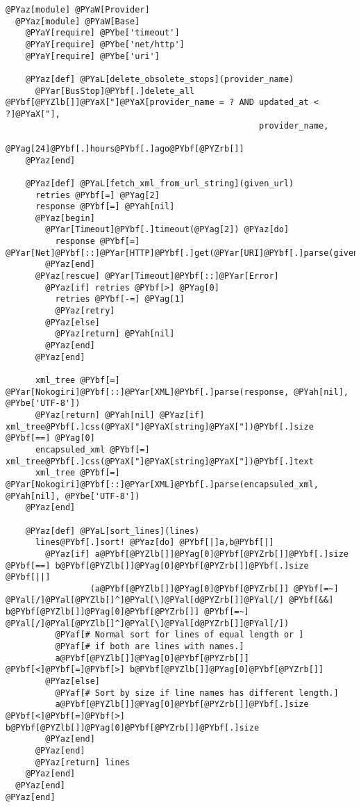 \begin{Verbatim}[commandchars=@\[\]]
@PYaz[module] @PYaW[Provider]
  @PYaz[module] @PYaW[Base]
    @PYaY[require] @PYbe['timeout']
    @PYaY[require] @PYbe['net/http']
    @PYaY[require] @PYbe['uri']
    
    @PYaz[def] @PYaL[delete_obsolete_stops](provider_name)
      @PYar[BusStop]@PYbf[.]delete_all @PYbf[@PYZlb[]]@PYaX["]@PYaX[provider_name = ? AND updated_at < ?]@PYaX["],
                                                   provider_name,
                                                    @PYag[24]@PYbf[.]hours@PYbf[.]ago@PYbf[@PYZrb[]]
    @PYaz[end]

    @PYaz[def] @PYaL[fetch_xml_from_url_string](given_url)
      retries @PYbf[=] @PYag[2]
      response @PYbf[=] @PYah[nil]
      @PYaz[begin]
        @PYar[Timeout]@PYbf[.]timeout(@PYag[2]) @PYaz[do] 
          response @PYbf[=] @PYar[Net]@PYbf[::]@PYar[HTTP]@PYbf[.]get(@PYar[URI]@PYbf[.]parse(given_url))
        @PYaz[end]
      @PYaz[rescue] @PYar[Timeout]@PYbf[::]@PYar[Error] 
        @PYaz[if] retries @PYbf[>] @PYag[0] 
          retries @PYbf[-=] @PYag[1] 
          @PYaz[retry] 
        @PYaz[else] 
          @PYaz[return] @PYah[nil]
        @PYaz[end] 
      @PYaz[end]

      xml_tree @PYbf[=] @PYar[Nokogiri]@PYbf[::]@PYar[XML]@PYbf[.]parse(response, @PYah[nil], @PYbe['UTF-8'])
      @PYaz[return] @PYah[nil] @PYaz[if] xml_tree@PYbf[.]css(@PYaX["]@PYaX[string]@PYaX["])@PYbf[.]size @PYbf[==] @PYag[0]
      encapsuled_xml @PYbf[=] xml_tree@PYbf[.]css(@PYaX["]@PYaX[string]@PYaX["])@PYbf[.]text
      xml_tree @PYbf[=] @PYar[Nokogiri]@PYbf[::]@PYar[XML]@PYbf[.]parse(encapsuled_xml, @PYah[nil], @PYbe['UTF-8'])
    @PYaz[end]

    @PYaz[def] @PYaL[sort_lines](lines)
      lines@PYbf[.]sort! @PYaz[do] @PYbf[|]a,b@PYbf[|]
        @PYaz[if] a@PYbf[@PYZlb[]]@PYag[0]@PYbf[@PYZrb[]]@PYbf[.]size @PYbf[==] b@PYbf[@PYZlb[]]@PYag[0]@PYbf[@PYZrb[]]@PYbf[.]size @PYbf[||]
                 (a@PYbf[@PYZlb[]]@PYag[0]@PYbf[@PYZrb[]] @PYbf[=~] @PYal[/]@PYal[@PYZlb[]^]@PYal[\]@PYal[d@PYZrb[]]@PYal[/] @PYbf[&&] b@PYbf[@PYZlb[]]@PYag[0]@PYbf[@PYZrb[]] @PYbf[=~] @PYal[/]@PYal[@PYZlb[]^]@PYal[\]@PYal[d@PYZrb[]]@PYal[/])
          @PYaf[# Normal sort for lines of equal length or ]
          @PYaf[# if both are lines with names.]
          a@PYbf[@PYZlb[]]@PYag[0]@PYbf[@PYZrb[]] @PYbf[<]@PYbf[=]@PYbf[>] b@PYbf[@PYZlb[]]@PYag[0]@PYbf[@PYZrb[]]            
        @PYaz[else]
          @PYaf[# Sort by size if line names has different length.]
          a@PYbf[@PYZlb[]]@PYag[0]@PYbf[@PYZrb[]]@PYbf[.]size @PYbf[<]@PYbf[=]@PYbf[>] b@PYbf[@PYZlb[]]@PYag[0]@PYbf[@PYZrb[]]@PYbf[.]size  
        @PYaz[end]
      @PYaz[end]
      @PYaz[return] lines
    @PYaz[end]
  @PYaz[end]
@PYaz[end]
\end{Verbatim}
